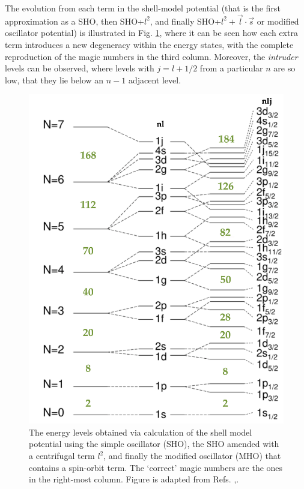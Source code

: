 The evolution from each term in the shell-model potential (that is the first approximation as a SHO, then SHO+$l^2$, and finally SHO+$l^2+\vec{l}\cdot\vec{s}$ or modified oscillator potential) is illustrated in Fig. \ref{energy-levels-mho}, where it can be seen how each extra term introduces a new degeneracy within the energy states, with the complete reproduction of the magic numbers in the third column. Moreover, the \emph{intruder} levels can be observed, where levels with $j=l+1/2$ from a particular $n$ are so low, that they lie below an $n-1$ adjacent level.
\begin{figure}
    \centering
    \includegraphics[scale=0.12]{Chapters/Figures/SM_level_scheme.png}
    \caption{The energy levels obtained via calculation of the shell model potential using the simple oscillator (SHO), the SHO amended with a centrifugal term $l^2$, and finally the modified oscillator (MHO) that contains a spin-orbit term. The `correct' magic numbers are the ones in the right-most column. Figure is adapted from Refs. \cite{matta2017exotic},\cite{krane1991introductory}.}
    \label{energy-levels-mho}
\end{figure}

